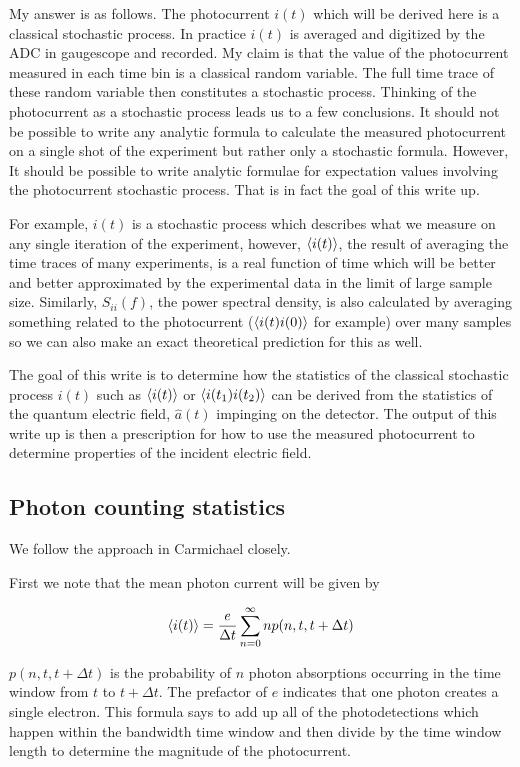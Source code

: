 \documentclass[12pt]{article}
\begin{document}
My answer is as follows. The photocurrent $i(t)$ which will be derived here is a classical stochastic process. In practice $i(t)$ is averaged and digitized by the ADC in gaugescope and recorded. My claim is that the value of the photocurrent measured in each time bin is a classical random variable. The full time trace of these random variable then constitutes a stochastic process. Thinking of the photocurrent as a stochastic process leads us to a few conclusions. It should not be possible to write any analytic formula to calculate the measured photocurrent on a single shot of the experiment but rather only a stochastic formula. However, It should be possible to write analytic formulae for expectation values involving the photocurrent stochastic process. That is in fact the goal of this write up.

For example, $i(t)$ is a stochastic process which describes what we measure on any single iteration of the experiment, however, $\braket{i(t)}$, the result of averaging the time traces of many experiments, is a real function of time which will be better and better approximated by the experimental data in the limit of large sample size. Similarly, $S_{ii}(f)$, the power spectral density, is also calculated by averaging something related to the photocurrent ($\braket{i(t)i(0)}$ for example) over many samples so we can also make an exact theoretical prediction for this as well.

The goal of this write is to determine how the statistics of the classical stochastic process $i(t)$ such as $\braket{i(t)}$ or $\braket{i(t_1)i(t_2)}$ can be derived from the statistics of the quantum electric field, $\hat{a}(t)$ impinging on the detector. The output of this write up is then a prescription for how to use the measured photocurrent to determine properties of the incident electric field.

\subsection{Photon counting statistics}

We follow the approach in Carmichael closely.

First we note that the mean photon current will be given by

\begin{equation}
\braket{i(t)} = \frac{e}{\Delta t} \sum_{n=0}^{\infty} n p(n, t, t+\Delta t)
\end{equation}

$p(n, t, t+\Delta t)$ is the probability of $n$ photon absorptions occurring in the time window from $t$ to $t+\Delta t$. The prefactor of $e$ indicates that one photon creates a single electron. This formula says to add up all of the photodetections which happen within the bandwidth time window and then divide by the time window length to determine the magnitude of the photocurrent.
\end{document}
